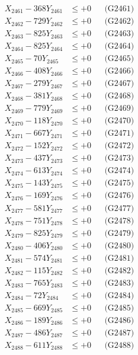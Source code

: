 \documentclass[a4paper,10pt]{article}
\begin{document}
{\begin{align}
\allowbreak
X_{2461} - 368Y_{2461} &\leq +0 && \text{(G2461)} \\
X_{2462} - 729Y_{2462} &\leq +0 && \text{(G2462)} \\
X_{2463} - 825Y_{2463} &\leq +0 && \text{(G2463)} \\
X_{2464} - 825Y_{2464} &\leq +0 && \text{(G2464)} \\
X_{2465} - 70Y_{2465} &\leq +0 && \text{(G2465)} \\
X_{2466} - 408Y_{2466} &\leq +0 && \text{(G2466)} \\
X_{2467} - 279Y_{2467} &\leq +0 && \text{(G2467)} \\
X_{2468} - 381Y_{2468} &\leq +0 && \text{(G2468)} \\
X_{2469} - 779Y_{2469} &\leq +0 && \text{(G2469)} \\
X_{2470} - 118Y_{2470} &\leq +0 && \text{(G2470)} \\
\allowbreak
X_{2471} - 667Y_{2471} &\leq +0 && \text{(G2471)} \\
X_{2472} - 152Y_{2472} &\leq +0 && \text{(G2472)} \\
X_{2473} - 437Y_{2473} &\leq +0 && \text{(G2473)} \\
X_{2474} - 613Y_{2474} &\leq +0 && \text{(G2474)} \\
X_{2475} - 143Y_{2475} &\leq +0 && \text{(G2475)} \\
X_{2476} - 169Y_{2476} &\leq +0 && \text{(G2476)} \\
X_{2477} - 581Y_{2477} &\leq +0 && \text{(G2477)} \\
X_{2478} - 751Y_{2478} &\leq +0 && \text{(G2478)} \\
X_{2479} - 825Y_{2479} &\leq +0 && \text{(G2479)} \\
X_{2480} - 406Y_{2480} &\leq +0 && \text{(G2480)} \\
\allowbreak
X_{2481} - 574Y_{2481} &\leq +0 && \text{(G2481)} \\
X_{2482} - 115Y_{2482} &\leq +0 && \text{(G2482)} \\
X_{2483} - 765Y_{2483} &\leq +0 && \text{(G2483)} \\
X_{2484} - 72Y_{2484} &\leq +0 && \text{(G2484)} \\
X_{2485} - 669Y_{2485} &\leq +0 && \text{(G2485)} \\
X_{2486} - 189Y_{2486} &\leq +0 && \text{(G2486)} \\
X_{2487} - 486Y_{2487} &\leq +0 && \text{(G2487)} \\
X_{2488} - 611Y_{2488} &\leq +0 && \text{(G2488)} \\

\end{align}}
\end{document}
